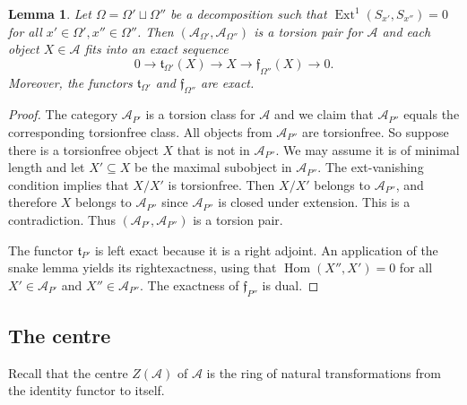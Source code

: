 \documentclass[a4paper]{amsart}
\theoremstyle{plain}
\newtheorem{lem}[thm]{Lemma}
\theoremstyle{definition}
\theoremstyle{remark}
\numberwithin{equation}{section}
\newcommand{\Ext}{\operatorname{Ext}}
\newcommand{\Hom}{\operatorname{Hom}}
\newcommand{\lto}{\longrightarrow}
\def\A{\mathcal A}
\newcommand{\frf}{\mathfrak{f}}
\newcommand{\frt}{\mathfrak{t}}
\begin{document}
\begin{lem}\label{le:torsion}
  Let $\Omega=\Omega'\sqcup \Omega''$ be a decomposition such that
  $\Ext^1(S_{x'}, S_{x''})=0$ for all $x'\in \Omega',x''\in
  \Omega''$. Then $(\A_{\Omega'},\A_{\Omega''})$ is a torsion pair for
  $\A$ and each object $X\in\A$ fits into an exact sequence
  \begin{equation*}\label{eq:tor}
    0\lto \frt_{\Omega'}(X)\lto X\lto \frf_{\Omega''}(X)\lto 0.
\end{equation*}    
Moreover, the functors $\frt_{\Omega'}$ and  $\frf_{\Omega''}$ are exact.
\end{lem}
\begin{proof}
    The category $\A_{P'}$ is a torsion class for $\A$ and we claim that
  $\A_{P''}$ equals the corresponding torsionfree class. All objects
  from $\A_{P''}$ are torsionfree. So suppose there is a torsionfree
  object $X$ that is not in $\A_{P''}$. We may assume it is of minimal
  length and let $X'\subseteq X$ be the maximal subobject in
  $\A_{P''}$. The ext-vanishing condition implies that $X/X'$ is
  torsionfree. Then $X/X'$ belongs to $\A_{P''}$, and therefore $X$
  belongs to $\A_{P''}$ since $\A_{P''}$ is closed under
  extension. This is a contradiction. Thus $(\A_{P'},\A_{P''})$ is a
  torsion pair.

The functor $\frt_{P'}$ is left exact because it is a right
adjoint. An application of the snake lemma yields its rightexactness,
using that $\Hom(X'',X')=0$ for all $X'\in \A_{P'}$ and
$X''\in \A_{P''}$. The exactness of $\frf_{P''}$ is dual.
\end{proof}

\subsection*{The centre}

Recall that the centre $Z(\A)$ of $\A$ is the ring of natural
transformations from the identity functor to itself.
\end{document}
